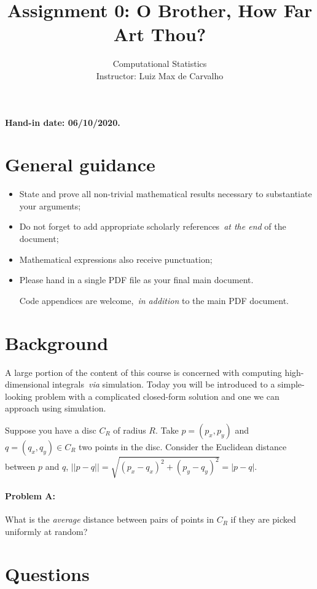 \documentclass[a4paper,10pt, notitlepage]{report}
\title{Assignment 0: O Brother, How Far Art Thou?}
\author{Computational Statistics \\ Instructor: Luiz Max de Carvalho}
\begin{document}
\maketitle

\textbf{Hand-in date: 06/10/2020.}

\section*{General guidance}
\begin{itemize}
 \item State and prove all non-trivial mathematical results necessary to substantiate your arguments;
 \item Do not forget to add appropriate scholarly references~\textit{at the end} of the document;
 \item Mathematical expressions also receive punctuation;
 \item Please hand in a single PDF file as your final main document.
 
 Code appendices are welcome,~\textit{in addition} to the main PDF document.
 \end{itemize}

\newpage

\section*{Background}

A large portion of the content of this course is concerned with computing high-dimensional integrals~\textit{via} simulation.
Today you will be introduced to a simple-looking problem with a complicated closed-form solution and one we can approach using simulation.

Suppose you have a disc $C_R$ of radius $R$. 
Take $p = (p_x, p_y)$ and $ q = (q_x, q_y) \in C_R$ two points in the disc.  
Consider the Euclidean distance between $p$  and $q$, $||p-q|| = \sqrt{(p_x-q_x)^2 + (p_y-q_y)^2} = |p-q|$.
\paragraph{Problem A:} What is the \textit{average} distance between pairs of points in $C_R$ if they are picked uniformly at random?

\section*{Questions}
\end{document}

